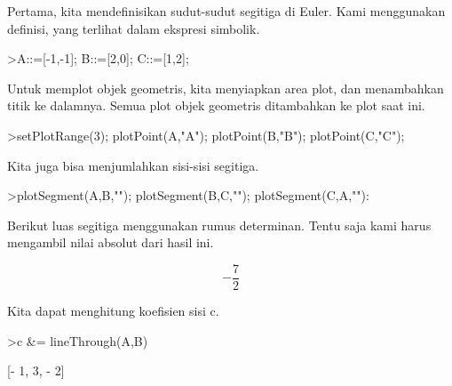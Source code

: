 \documentclass{article}
\begin{document}
\begin{eulernotebook}
\begin{eulercomment}
\begin{eulercomment}
\begin{eulercomment}
\begin{eulercomment}
\begin{eulercomment}
Pertama, kita mendefinisikan sudut-sudut segitiga di Euler. Kami
menggunakan definisi, yang terlihat dalam ekspresi simbolik.
\end{eulercomment}
\begin{eulerprompt}
>A::=[-1,-1]; B::=[2,0]; C::=[1,2];
\end{eulerprompt}
\begin{eulercomment}
Untuk memplot objek geometris, kita menyiapkan area plot, dan
menambahkan titik ke dalamnya. Semua plot objek geometris ditambahkan
ke plot saat ini.
\end{eulercomment}
\begin{eulerprompt}
>setPlotRange(3); plotPoint(A,"A"); plotPoint(B,"B"); plotPoint(C,"C");
\end{eulerprompt}
\begin{eulercomment}
Kita juga bisa menjumlahkan sisi-sisi segitiga.
\end{eulercomment}
\begin{eulerprompt}
>plotSegment(A,B,""); plotSegment(B,C,""); plotSegment(C,A,""):
\end{eulerprompt}
\begin{eulercomment}
Berikut luas segitiga menggunakan rumus determinan. Tentu saja kami
harus mengambil nilai absolut dari hasil ini.
\end{eulercomment}
\begin{eulerformula}
\[
-\frac{7}{2}
\]
\end{eulerformula}
\begin{eulercomment}
Kita dapat menghitung koefisien sisi c.
\end{eulercomment}
\begin{eulerprompt}
>c &= lineThrough(A,B)
\end{eulerprompt}
\begin{euleroutput}
  
                              [- 1, 3, - 2]
  

\end{euleroutput}
\end{eulercomment}
\end{eulercomment}
\end{eulercomment}
\end{eulercomment}
\end{eulernotebook}
\end{document}
